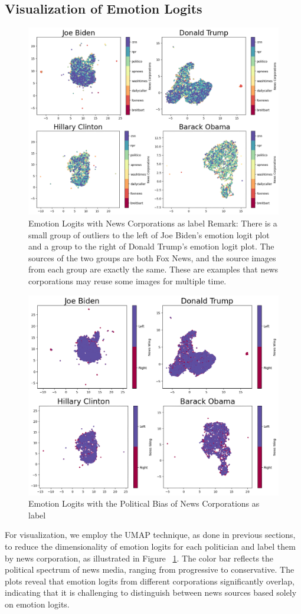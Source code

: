 \documentclass[sigconf]{acmart}
\begin{document}
\subsection{Visualization of Emotion Logits}\label{sec:vis}

\begin{figure}
    \centering
    \includegraphics[width=.5\textwidth]{assets/emotion_cor.png}
    \caption{Emotion Logits with News Corporations as label \newline Remark: There is a small group of outliers to the left of Joe Biden's emotion logit plot and a group to the right of Donald Trump's emotion logit plot. The sources of the two groups are both Fox News, and the source images from each group are exactly the same. These are examples that news corporations may reuse some images for multiple time.}
    \label{fig:emo_cors}
    \vspace{10pt}
\end{figure}

\begin{figure}
    \centering
    \includegraphics[width=.5\textwidth]{assets/emotion_bias.png}
    \caption{Emotion Logits with the Political Bias of News Corporations as label}
    \label{fig:emo_bias}
    \vspace{10pt}
\end{figure}


For visualization, we employ the UMAP technique, as done in previous sections, to reduce the dimensionality of emotion logits for each politician and label them by news corporation, as illustrated in Figure ~\ref{fig:emo_cors}. The color bar reflects the political spectrum of news media, ranging from progressive to conservative. The plots reveal that emotion logits from different corporations significantly overlap, indicating that it is challenging to distinguish between news sources based solely on emotion logits.
\end{document}
